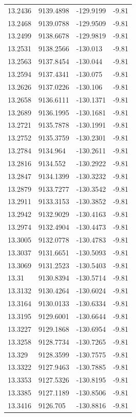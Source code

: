 \begin{table}[H]
\begin{tabular}{llll}
13.2436 & 9139.4898 & -129.9199 & -9.81 \\
13.2468 & 9139.0788 & -129.9509 & -9.81 \\
13.2499 & 9138.6678 & -129.9819 & -9.81 \\
13.2531 & 9138.2566 & -130.013 & -9.81 \\
13.2563 & 9137.8454 & -130.044 & -9.81 \\
13.2594 & 9137.4341 & -130.075 & -9.81 \\
13.2626 & 9137.0226 & -130.106 & -9.81 \\
13.2658 & 9136.6111 & -130.1371 & -9.81 \\
13.2689 & 9136.1995 & -130.1681 & -9.81 \\
13.2721 & 9135.7878 & -130.1991 & -9.81 \\
13.2752 & 9135.3759 & -130.2301 & -9.81 \\
13.2784 & 9134.964 & -130.2611 & -9.81 \\
13.2816 & 9134.552 & -130.2922 & -9.81 \\
13.2847 & 9134.1399 & -130.3232 & -9.81 \\
13.2879 & 9133.7277 & -130.3542 & -9.81 \\
13.2911 & 9133.3153 & -130.3852 & -9.81 \\
13.2942 & 9132.9029 & -130.4163 & -9.81 \\
13.2974 & 9132.4904 & -130.4473 & -9.81 \\
13.3005 & 9132.0778 & -130.4783 & -9.81 \\
13.3037 & 9131.6651 & -130.5093 & -9.81 \\
13.3069 & 9131.2523 & -130.5403 & -9.81 \\
13.31 & 9130.8394 & -130.5714 & -9.81 \\
13.3132 & 9130.4264 & -130.6024 & -9.81 \\
13.3164 & 9130.0133 & -130.6334 & -9.81 \\
13.3195 & 9129.6001 & -130.6644 & -9.81 \\
13.3227 & 9129.1868 & -130.6954 & -9.81 \\
13.3258 & 9128.7734 & -130.7265 & -9.81 \\
13.329 & 9128.3599 & -130.7575 & -9.81 \\
13.3322 & 9127.9463 & -130.7885 & -9.81 \\
13.3353 & 9127.5326 & -130.8195 & -9.81 \\
13.3385 & 9127.1189 & -130.8506 & -9.81 \\
13.3416 & 9126.705 & -130.8816 & -9.81 \\

\end{tabular}
\end{table}
